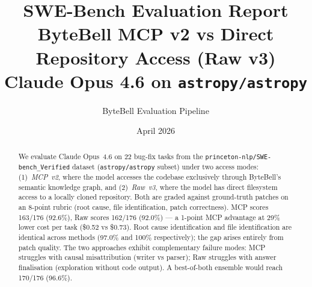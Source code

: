\documentclass[a4paper,11pt]{article}
\title{%
  \vspace{-1.5cm}
  \textbf{SWE-Bench Evaluation Report}\\[6pt]
  \large ByteBell MCP v2 vs Direct Repository Access (Raw v3)\\[4pt]
  \normalsize Claude Opus 4.6 on \texttt{astropy/astropy}
}
\author{ByteBell Evaluation Pipeline}
\date{April 2026}
\begin{document}
\maketitle
\thispagestyle{fancy}

\begin{abstract}
\noindent
We evaluate Claude Opus~4.6 on 22 bug-fix tasks from the
\texttt{princeton-nlp/SWE-bench\_Verified} dataset
(\texttt{astropy/astropy} subset) under two access modes:
(1)~\emph{MCP~v2}, where the model accesses the codebase exclusively
through ByteBell's semantic knowledge graph, and
(2)~\emph{Raw~v3}, where the model has direct filesystem access to a
locally cloned repository.
Both are graded against ground-truth patches on an 8-point rubric
(root cause, file identification, patch correctness).
MCP scores 163/176 (92.6\%), Raw scores 162/176 (92.0\%) --- a
1-point MCP advantage at 29\% lower cost per task (\$0.52 vs \$0.73).
Root cause identification and file identification are identical
across methods (97.0\% and 100\% respectively); the gap arises
entirely from patch quality.
The two approaches exhibit complementary failure modes:
MCP struggles with causal misattribution (writer vs parser);
Raw struggles with answer finalisation (exploration without code
output).
A best-of-both ensemble would reach 170/176 (96.6\%).
\end{abstract}

\tableofcontents
\newpage



\newpage



\newpage



\end{document}

